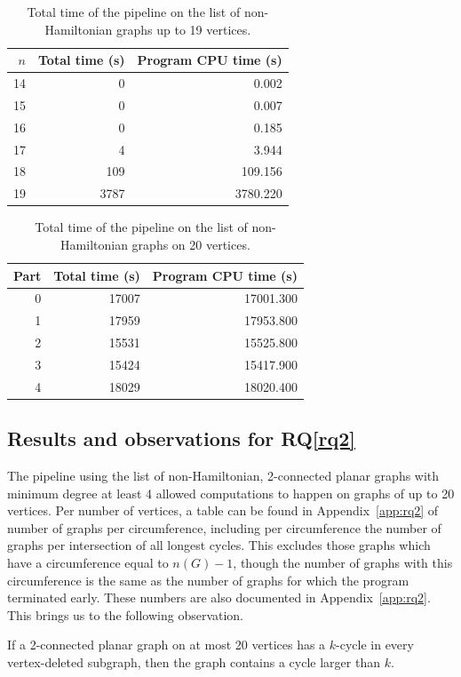 \begin{table}[ht]
\centering
\caption{Total time of the pipeline on the list of non-Hamiltonian graphs up to 19 vertices.}
\label{tab:timing-nonhamil-up-to-19}
\begin{tabular}{rrr}
\toprule
$n$ & Total time (s) & Program CPU time (s) \\
\midrule
14 & 0 & 0.002 \\
15 & 0 & 0.007 \\
16 & 0 & 0.185 \\
17 & 4 & 3.944 \\
18 & 109 & 109.156 \\
19 & 3787 & 3780.220 \\
\bottomrule
\end{tabular}
\end{table}

\begin{table}[ht]
\centering
\caption{Total time of the pipeline on the list of non-Hamiltonian graphs on 20 vertices.}
\label{tab:timing-nonhamil-20}
\begin{tabular}{rrr}
\toprule
Part & Total time (s) & Program CPU time (s) \\
\midrule
0 & 17007 & 17001.300 \\
1 & 17959 & 17953.800 \\
2 & 15531 & 15525.800 \\
3 & 15424 & 15417.900 \\
4 & 18029 & 18020.400 \\
\bottomrule
\end{tabular}
\end{table}

\subsection{Results and observations for RQ\ref{rq2}}

The pipeline using the list of non-Hamiltonian, 2-connected planar graphs with minimum degree at least 4 allowed computations to happen on graphs of up to 20 vertices. Per number of vertices, a table can be found in Appendix~\ref{app:rq2} of number of graphs per circumference, including per circumference the number of graphs per intersection of all longest cycles. This excludes those graphs which have a circumference equal to $n(G)-1$, though the number of graphs with this circumference is the same as the number of graphs for which the program terminated early. These numbers are also documented in Appendix~\ref{app:rq2}. This brings us to the following observation.
\begin{observation}
    \label{obs:planar-20-nothing}
    If a 2-connected planar graph on at most 20 vertices has a $k$-cycle in every vertex-deleted subgraph, then the graph contains a cycle larger than $k$.
\end{observation}

